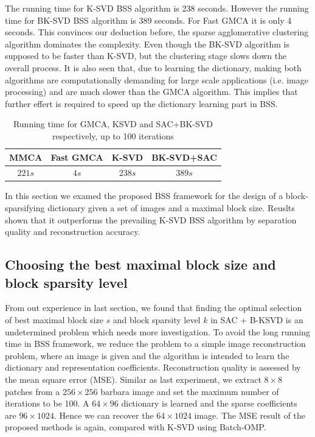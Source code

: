The running time for K-SVD BSS algorithm is 238 seconds. However the running time for BK-SVD BSS algorithm is 389 seconds. For Fast GMCA it is only 4 seconds. This convinces our deduction before, the sparse agglomerative clustering algorithm dominates the complexity. Even though the BK-SVD algorithm is supposed to be faster than K-SVD, but the clustering stage slows down the overall process. It is also seen that, due to learning the dictionary, making both algorithms are computationally demanding for large scale applications (i.e. image processing) and are much slower than the GMCA algorithm. This implies that further effert is required to speed up the dictionary learning part in BSS. \\
\begin{table}[!htbp]
\centering
    \begin{tabular}{|c|c|c|c|}
    \hline
    MMCA & Fast GMCA & K-SVD & BK-SVD+SAC \\\hline
    $221s$ & $4s$ & $238s$ & $389s$ \\\hline
    \end{tabular}
    \caption{Running time for GMCA, KSVD and SAC+BK-SVD respectively, up to 100 iterations}
\end{table}

In this section we examed the proposed BSS framework for the design of a block-sparsifying dictionary given a set of images and a maximal block size. Reuslts shown that it outperforms the prevailing K-SVD BSS algorithm by separation quality and reconstruction accuracy.

\subsection{Choosing the best maximal block size and block sparsity level}
From out experience in last section, we found that finding the optimal selection of best maximal block size $s$ and block sparsity level $k$ in SAC + B-KSVD is an undetermined problem which needs more investigation. To avoid the long running time in BSS framework, we reduce the problem to a simple image reconstruction problem, where an image is given and the algorithm is intended to learn the dictionary and representation coefficients. Reconstruction quality is assessed by the mean square error (MSE). Similar as last experiment, we extract $8 \times 8$ patches from a $256 \times 256$ barbara image and set the maximum number of iterations to be 100. A $64 \times 96$ dictionary is learned and the sparse coefficients are $96\times1024$. Hence we can recover the $64\times1024$ image. The MSE result of the proposed methods is again, compared with K-SVD using Batch-OMP.\\

